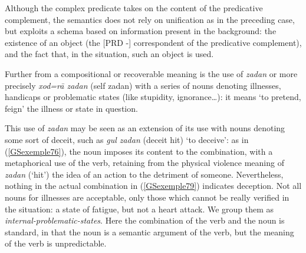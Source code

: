 \documentclass[output=paper
                ,modfonts
                ,nonflat
	        ,collection
	        ,collectionchapter
	        ,collectiontoclongg
 	        ,biblatex
                ,babelshorthands
                ,newtxmath
                ,draftmode
                ,colorlinks, citecolor=brown
]{./langsci/langscibook}
\begin{document}
{Although the complex predicate takes on the content of the predicative complement, the semantics does not rely on unification as in the preceding case, but exploits a schema based on information present in the background: the existence of an object (the [PRD -] correspondent of the predicative complement), and the fact that, in the situation, such an object is used.  

Further from a compositional or recoverable meaning is the use of \textit{zadan} or more precisely \textit{xod=r\=a zadan} (self zadan) with a series of nouns denoting illnesses, handicaps or problematic states (like stupidity, ignorance…): it means `to pretend, feign' the illness or state in question.

\begin{exe}
	\label{GSexemple79}
\end{exe}

This use of \textit{zadan} may be seen as an extension of its use with nouns denoting some sort of deceit, such as \textit{gul zadan} (deceit hit) `to deceive’: as in (\ref{GSexemple76}), the noun imposes its content to the combination, with a metaphorical use of the verb, retaining from the physical violence meaning of \textit{zadan} (`hit’) the idea of an action to the detriment of someone. Nevertheless, nothing in the actual combination in (\ref{GSexemple79}) indicates deception. Not all nouns for illnesses are acceptable, only those which cannot be really verified in the situation: a state of fatigue, but not a heart attack. We group them as \textit{internal-problematic-states}. Here the combination of the verb and the noun is standard, in that the noun is a semantic argument of the verb, but the meaning of the verb is unpredictable.

}
\end{document}
